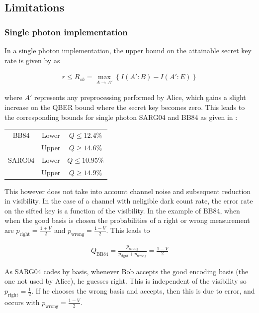 \documentclass[paper=a4, fontsize=11pt]{scrartcl} %
\numberwithin{equation}{section} %
\numberwithin{figure}{section} %
\numberwithin{table}{section} %
\begin{document}
\subsection{Limitations}
\subsubsection{Single photon implementation}
In a single photon implementation, the upper bound on the attainable secret key rate is given by \citet{csiszarAssump} as

\begin{align}
r \leq R_{sk} = \max_{A \rightarrow A'}
\left\{
I(A':B) - I(A': E)
\right\}
\end{align}

where $A'$ represents any preprocessing performed by Alice, which gains a slight increase on the QBER bound where the secret key
becomes zero. This leads to the corresponding bounds for single photon SARG04 and BB84 as given in \citet{bounds, branciardSARG04}:

\bgroup
\def\arraystretch{1.2}%
\begin{center}
\begin{tabular}{c c c}
\hline
BB84 						& Lower & $Q \leq 12.4\%$ \\
\hphantom{BB84}	& Upper & $Q \geq 14.6\%$\\
\hline
SARG04  				& Lower & $Q \leq 10.95\%$ \\
\hphantom{BB84}	& Upper & $Q \geq 14.9\%$\\
\hline
\end{tabular}
\end{center}
\egroup

This however does not take into account channel noise and subsequent reduction in visibility. In the case of a channel with
neligible dark count rate, the error rate on the sifted key is a function of the visibility. In the example of BB84, when
when the good basis is chosen the probabilities of a right or wrong measurement are $p_{\mathrm{right}} = \frac{1+V}{2}$ and
$p_{\mathrm{wrong}} = \frac{1-V}{2}$. This leads to

\begin{align}
	Q_{\mathrm{BB84}} =
	\frac{p_{\mathrm{wrong}}}{p_{\mathrm{right}} + p_{\mathrm{wrong}}}
	= \frac{1-V}{2}
\end{align}

As SARG04 codes by basis, whenever Bob accepts the good encoding basis (the one not used by Alice), he guesses right.
This is independent of the visibility so $p_{\mathrm{right}} = \frac{1}{2}$. If he chooses the wrong basis and accepts,
then this is due to error, and occurs with $p_{\mathrm{wrong}} = \frac{1-V}{2}$.
\end{document}
